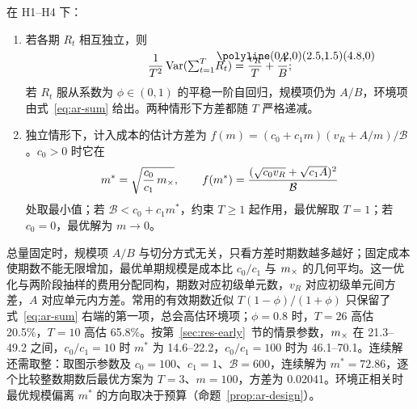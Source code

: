 \begin{proposition}[多期分配与成本]
\label{prop:allocation}
在 H1--H4 下：
\begin{enumerate}[label=(\roman*)]
  \item 若各期 $R_t$ 相互独立，则
  \begin{equation}
    \frac{1}{T^2}\Var({\textstyle\sum_{t=1}^{T}}\widehat R_t)=\frac{v_R}{T}+\frac{A}{B};
    \label{eq:alloc-indep}
  \end{equation}
  若 $R_t$ 服从系数为 $\phi\in(0,1)$ 的平稳一阶自回归，规模项仍为 $A/B$，环境项由式~\eqref{eq:ar-sum} 给出。两种情形下方差都随 $T$ 严格递减。
  \item 独立情形下，计入成本的估计方差为 $f(m)=(c_0+c_1m)(v_R+A/m)/\mathcal B$。$c_0>0$ 时它在
  \begin{equation}
    m^*=\sqrt{\frac{c_0}{c_1}\,m_{\times}},\qquad
    f(m^*)=\frac{(\sqrt{c_0v_R}+\sqrt{c_1A})^2}{\mathcal B}
    \label{eq:optimal-m}
  \end{equation}
  处取最小值；若 $\mathcal B<c_0+c_1m^*$，约束 $T\geq1$ 起作用，最优解取 $T=1$；若 $c_0=0$，最优解为 $m\to0$。
\end{enumerate}
\end{proposition}

总量固定时，规模项 $A/B$ 与切分方式无关，只看方差时期数越多越好；固定成本使期数不能无限增加，最优单期规模是成本比 $c_0/c_1$ 与 $m_{\times}$ 的几何平均。这一优化与两阶段抽样的费用分配同构\citep{cochran1977sampling}，期数对应初级单元数，$v_R$ 对应初级单元间方差，$A$ 对应单元内方差。常用的有效期数近似 $T(1-\phi)/(1+\phi)$ 只保留了式~\eqref{eq:ar-sum} 右端的第一项，总会高估环境项；$\phi=0.8$ 时，$T=26$ 高估 20.5\%，$T=10$ 高估 65.8\%。按第~\ref{sec:res-early}~节的情景参数，$m_{\times}$ 在 21.3--49.2 之间，$c_0/c_1=10$ 时 $m^*$ 为 14.6--22.2，$c_0/c_1=100$ 时为 46.1--70.1。连续解还需取整：取图示参数及 $c_0=100$、$c_1=1$、$\mathcal B=600$，连续解为 $m^*=72.86$，逐个比较整数期数后最优方案为 $T=3$、$m=100$，方差为 0.02041。环境正相关时最优规模偏离 $m^*$ 的方向取决于预算（命题~\ref{prop:ar-design}）。

